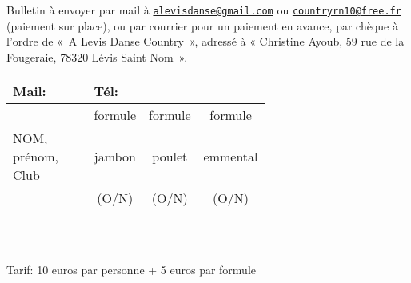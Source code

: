 \documentclass[12pt,a4paper]{article}
\begin{document}
Bulletin à envoyer par mail à
\href{mailto:alevisdanse@gmail.com?subject=Inscription Bal 13
  Decembre}{\texttt{\color{blue!50!black}alevisdanse@gmail.com}} ou
\href{mailto:countryrn10@free.fr}{\texttt{\color{blue!50!black}countryrn10@free.fr}}
(paiement sur place), ou par courrier pour un paiement en avance, par
chèque à l'ordre de «~A Levis Danse Country~», adressé à « Christine Ayoub, 59 rue de
la Fougeraie, 78320 Lévis Saint Nom~».
\begin{center}
  \begin{tabular}{|p{0.64\linewidth}|c|c|c|}
    \hline
    \multicolumn{1}{|l|}{Mail:} & \multicolumn{3}{l|}{Tél:} \\
\hline\hline
     & formule & formule & formule \\
  NOM, prénom, Club    & jambon  & poulet  & emmental  \\
  &  (O/N) & (O/N) &  (O/N) \\
  \hline
  & & & \\
  & & & \\
  \hline
  & & & \\
  & & & \\
  \hline
  & & & \\
  & & & \\
  \hline
  & & & \\
  & & & \\
  \hline
\end{tabular}
\end{center}
Tarif: 10 euros par personne + 5 euros par formule
\end{document}
